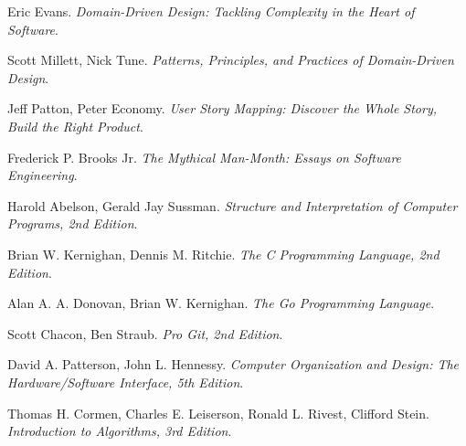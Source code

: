 \begin{thebibliography}{20}
{ Eric Evans.
  \newblock \emph{Domain-Driven Design: Tackling Complexity in the Heart of Software}.

 Scott Millett, Nick Tune.
  \newblock \emph{Patterns, Principles, and Practices of Domain-Driven Design}.

 Jeff Patton, Peter Economy.
  \newblock \emph{User Story Mapping: Discover the Whole Story, Build the Right Product}.


 Frederick P. Brooks Jr.
  \newblock \emph{The Mythical Man-Month: Essays on Software Engineering}.

 Harold Abelson, Gerald Jay Sussman.
  \newblock \emph{Structure and Interpretation of Computer Programs, 2nd Edition}.

 Brian W. Kernighan, Dennis M. Ritchie.
  \newblock \emph{The C Programming Language, 2nd Edition}.

 Alan A. A. Donovan, Brian W. Kernighan.
  \newblock \emph{The Go Programming Language}.

 Scott Chacon, Ben Straub.
  \newblock \emph{Pro Git, 2nd Edition}.

 David A. Patterson, John L. Hennessy.
  \newblock \emph{Computer Organization and Design: The Hardware/Software Interface, 5th Edition}.

 Thomas H. Cormen, Charles E. Leiserson, Ronald L. Rivest, Clifford Stein.
  \newblock \emph{Introduction to Algorithms, 3rd Edition}.

}

\end{thebibliography}

\endinput